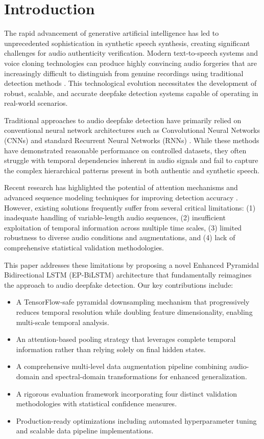 \documentclass[conference]{IEEEtran}
\begin{document}
\section{Introduction}

The rapid advancement of generative artificial intelligence has led to unprecedented sophistication in synthetic speech synthesis, creating significant challenges for audio authenticity verification. Modern text-to-speech systems and voice cloning technologies can produce highly convincing audio forgeries that are increasingly difficult to distinguish from genuine recordings using traditional detection methods \cite{wang2020cnn}. This technological evolution necessitates the development of robust, scalable, and accurate deepfake detection systems capable of operating in real-world scenarios.

Traditional approaches to audio deepfake detection have primarily relied on conventional neural network architectures such as Convolutional Neural Networks (CNNs) and standard Recurrent Neural Networks (RNNs) \cite{frank2021wavefake}. While these methods have demonstrated reasonable performance on controlled datasets, they often struggle with temporal dependencies inherent in audio signals and fail to capture the complex hierarchical patterns present in both authentic and synthetic speech.

Recent research has highlighted the potential of attention mechanisms and advanced sequence modeling techniques for improving detection accuracy \cite{zhang2021capsule}. However, existing solutions frequently suffer from several critical limitations: (1) inadequate handling of variable-length audio sequences, (2) insufficient exploitation of temporal information across multiple time scales, (3) limited robustness to diverse audio conditions and augmentations, and (4) lack of comprehensive statistical validation methodologies.

This paper addresses these limitations by proposing a novel Enhanced Pyramidal Bidirectional LSTM (EP-BiLSTM) architecture that fundamentally reimagines the approach to audio deepfake detection. Our key contributions include:

\begin{itemize}
\item A TensorFlow-safe pyramidal downsampling mechanism that progressively reduces temporal resolution while doubling feature dimensionality, enabling multi-scale temporal analysis.
\item An attention-based pooling strategy that leverages complete temporal information rather than relying solely on final hidden states.
\item A comprehensive multi-level data augmentation pipeline combining audio-domain and spectral-domain transformations for enhanced generalization.
\item A rigorous evaluation framework incorporating four distinct validation methodologies with statistical confidence measures.
\item Production-ready optimizations including automated hyperparameter tuning and scalable data pipeline implementations.
\end{itemize}
\end{document}
